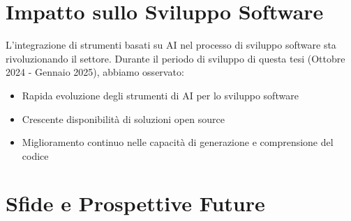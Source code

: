 \documentclass[12pt,a4paper,openright,twoside]{book}
\begin{document}
\section{Impatto sullo Sviluppo Software}
L'integrazione di strumenti basati su AI nel processo di sviluppo software sta rivoluzionando il settore. Durante il periodo di sviluppo di questa tesi (Ottobre 2024 - Gennaio 2025), abbiamo osservato:
\begin{itemize}
    \item Rapida evoluzione degli strumenti di AI per lo sviluppo software
    \item Crescente disponibilità di soluzioni open source
    \item Miglioramento continuo nelle capacità di generazione e comprensione del codice
\end{itemize}

\section{Sfide e Prospettive Future}


%



\backmatter

\nocite{*} %


%

\end{document}

